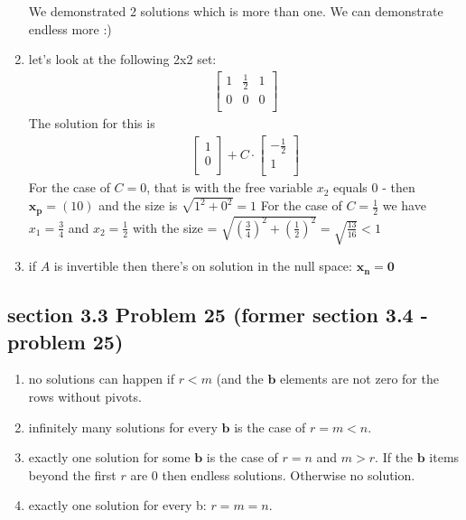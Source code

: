 \documentclass[a4paper,11pt]{article}
\newcommand{\mybf}[1]{\boldsymbol{#1}}
\begin{document}
\begin{enumerate}[label=\alph*]
We demonstrated 2 solutions which is more than one. We can demonstrate endless more :)
\item let's look at the following 2x2 set:
\begin{align*}
\left[
\begin{array}{cc|c}
1 & \frac{1}{2} & 1 \\
0 & 0 			& 0 \\
\end{array}
\right]
\end{align*}
The solution for this is 
\begin{align*}
\begin{bmatrix}
1 \\
0 \\
\end{bmatrix}
+
C \cdot 
\begin{bmatrix}
-\frac{1}{2} \\
1 \\
\end{bmatrix}
\end{align*}
For the case of $C=0$, that is with the free variable $x_2$ equals 0 - then $\mybf{x_p}=(1 0)$ and the size is $\sqrt{1^2+0^2}=1$
For the case of $C=\frac{1}{2}$ we have $x_1=\frac{3}{4}$ and $x_2=\frac{1}{2}$ with the size = $\sqrt{{(\frac{3}{4})}^2+{(\frac{1}{2})}^2}=\sqrt{\frac{13}{16}}<1$
\item if $A$ is invertible then there's on solution in the null space: $\mybf{x_n}=\mybf{0}$
\end{enumerate}
\subsection*{section 3.3 Problem 25 (former section 3.4 - problem 25)} 
\begin{enumerate}[label=\alph*]
\item no solutions can happen if $r<m$ (and the $\mybf{b}$ elements are not zero for the rows without pivots. 
\item infinitely many solutions for every $\mybf{b}$ is the case of $r=m<n$.
\item exactly one solution for some $\mybf{b}$ is the case of $r=n$ and $m>r$. If the $\mybf{b}$ items beyond the first $r$ are 0 then endless solutions. Otherwise no solution.
\item exactly one solution for every b: $r=m=n$. 
\end{enumerate}
\end{document}
